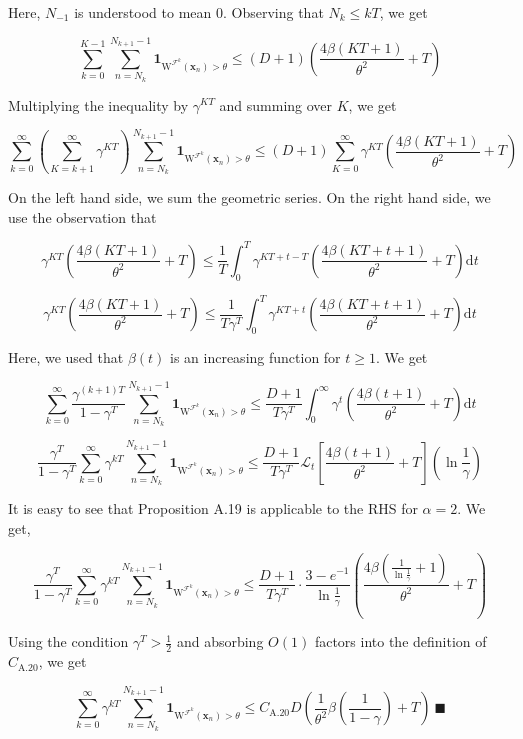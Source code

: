 \documentclass[a4paper]{article}
\newcommand{\AP}[1]{\left(#1\right)}
\newcommand{\AB}[1]{\left[#1\right]}
\newcommand{\D}{\mathrm{d}} %
\newcommand{\La}{\mathcal{L}}
\newcommand{\F}{\mathcal{F}}
\newcommand{\W}{\mathrm{W}}
\begin{document}
Here, $N_{-1}$ is understood to mean $0$. Observing that $N_k\leq kT$, we get

$$\sum_{k=0}^{K-1}\sum_{n=N_k}^{N_{k+1}-1}{\boldsymbol{1}_{\W^{\F^k}\AP{\boldsymbol{x}_{n}}>\theta}
} \leq(D+1)\AP{\frac{4\beta\AP{KT+1}}{\theta^{2}}+T}$$

Multiplying the inequality by $\gamma^{KT}$ and summing over $K$, we get

$$\sum_{k=0}^{\infty}\AP{\sum_{K=k+1}^\infty \gamma^{KT}}\sum_{n=N_k}^{N_{k+1}-1}{\boldsymbol{1}_{\W^{\F^k}\AP{\boldsymbol{x}_{n}}>\theta}} \leq(D+1)\sum_{K=0}^\infty\gamma^{KT}\AP{\frac{4\beta\AP{KT+1}}{\theta^{2}}+T}$$

On the left hand side, we sum the geometric series. On the right hand side, we use the observation that

$$\gamma^{KT}\AP{\frac{4\beta\AP{KT+1}}{\theta^{2}}+T} \leq \frac{1}{T}\int_0^T \gamma^{KT+t-T}\AP{\frac{4\beta\AP{KT+t+1}}{\theta^2}+T}\D t$$

$$\gamma^{KT}\AP{\frac{4\beta\AP{KT+1}}{\theta^{2}}+T} \leq \frac{1}{T\gamma^T}\int_0^T \gamma^{KT+t}\AP{\frac{4\beta\AP{KT+t+1}}{\theta^2}+T}\D t$$

Here, we used that $\beta(t)$ is an increasing function for $t\geq 1$. We get

$$\sum_{k=0}^{\infty}\frac{\gamma^{(k+1)T}}{1-\gamma^T}\sum_{n=N_k}^{N_{k+1}-1}{\boldsymbol{1}_{\W^{\F^k}\AP{\boldsymbol{x}_{n}}>\theta}} \leq \frac{D+1}{T\gamma^T}\int_0^\infty\gamma^{t}\AP{\frac{4\beta(t+1)}{\theta^2}+T}\D t$$

$$\frac{\gamma^T}{1-\gamma^T}\sum_{k=0}^{\infty}\gamma^{kT}\sum_{n=N_k}^{N_{k+1}-1}{\boldsymbol{1}_{\W^{\F^k}\AP{\boldsymbol{x}_{n}}>\theta}} \leq \frac{D+1}{T\gamma^T}\La_t\AB{\frac{4\beta(t+1)}{\theta^2}+T}\AP{\ln\frac{1}{\gamma}}$$

It is easy to see that Proposition A.19 is applicable to the RHS for $\alpha=2$. We get,

$$\frac{\gamma^T}{1-\gamma^T}\sum_{k=0}^{\infty}\gamma^{kT}\sum_{n=N_k}^{N_{k+1}-1}{\boldsymbol{1}_{\W^{\F^k}\AP{\boldsymbol{x}_{n}}>\theta}} \leq \frac{D+1}{T\gamma^T}\cdot\frac{3-e^{-1}}{\ln\frac{1}{\gamma}}\AP{\frac{4\beta\AP{\frac{1}{\ln\frac{1}{\gamma}}+1}}{\theta^2}+T}$$

Using the condition $\gamma^T>\frac{1}{2}$ and absorbing $O(1)$ factors into the definition of $C_{\text{A.20}}$, we get

$$\sum_{k=0}^{\infty}\gamma^{kT}\sum_{n=N_k}^{N_{k+1}-1}{\boldsymbol{1}_{\W^{\F^k}\AP{\boldsymbol{x}_{n}}>\theta}} \leq C_{\text{A.20}} D\AP{\frac{1}{\theta^2}\beta\AP{\frac{1}{1-\gamma}}+T}\ \blacksquare$$
\end{document}
